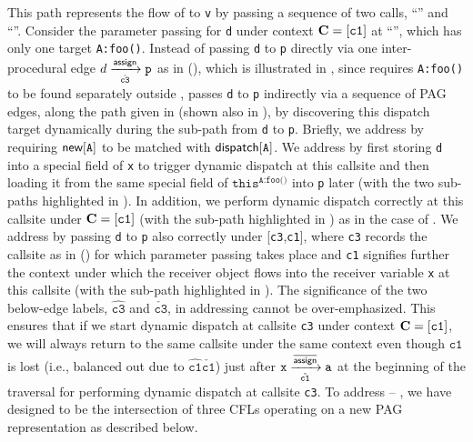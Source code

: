 This path represents the flow of  to \texttt{v} by passing a sequence of
two calls,  ``'' and ``''. Consider the
parameter passing for \texttt{d} under  context $\textbf{C}=[\texttt{c1}]$ at ``'', which has only one target \texttt{A:foo()}.
 Instead of passing \texttt{d} to \texttt{p} directly via  one inter-procedural
\assign edge 
$d\xrightarrow[\hat{{\mathtt{c3}}}]{\textsf{assign}} \mathtt{p}$
as in \manuLFC (), which is illustrated in
, since \manuLFC requires  \texttt{A:foo()}
 to be found separately outside \manuLFC, \LFCR passes \texttt{d} to \texttt{p} indirectly
 via a sequence of PAG edges, along the path given in
  (shown also in  ),  by discovering this dispatch target dynamically during
 the sub-path from \texttt{d} to \texttt{p}. Briefly, we address 
  by requiring $\textsf{new}[\texttt{A}]$ to be matched with $\textsf{dispatch}[\texttt{A}]$.
 We address  by first storing \texttt{d} into a special field of \texttt{x}
 to trigger dynamic dispatch at this callsite 
 and then loading it from the same special field of $\texttt{this}^\texttt{A:foo()}$
 into \texttt{p} later (with the two sub-paths highlighted in
 \crule[\chIIcolor]{1.5ex}{1.5ex}). In addition, we
 perform dynamic dispatch correctly at this callsite under 
 $\textbf{C}=[\texttt{c1}]$ (with the sub-path highlighted in \crule[\chIIIcolor]{1.5ex}{1.5ex}) as
 in the case of \manuLFC. We address  by passing \texttt{d} to \texttt{p}
 also correctly under  [\texttt{c3},\texttt{c1}], where \texttt{c3}  records the  callsite as in
 \manuLFC () for which parameter passing takes place
 and \texttt{c1} signifies further the
 context under which the receiver object  flows into the receiver
 variable \texttt{x} at this callsite
  (with the sub-path highlighted in \crule[\chIVcolor]{1.5ex}{1.5ex}). The significance
  of the two below-edge labels,
  $\hat{\boxed{\texttt{c3}}}$ and $\check{\boxed{\texttt{c3}}}$, in addressing  cannot be
  over-emphasized. This ensures that if we start dynamic dispatch at callsite 
  \texttt{c3} under context $\textbf{C}=[\texttt{c1}]$, we will always return
  to the same callsite    under the same context 
  even though  $\texttt{c1}$ is lost (i.e., balanced out due to
  $\hat{{\texttt{c1}}}\check{{\texttt{c1}}}$) just after
  $\mathtt{x}\xrightarrow[\check{{\mathtt{c1}}}]{\overline{\textsf{assign}}} \mathtt{a}$ at the beginning of the
  traversal for performing
  dynamic dispatch at callsite \texttt{c3}.
  To address   -- , we
  have designed \LFCR to be the intersection of three CFLs operating on a new
  PAG representation as described below.